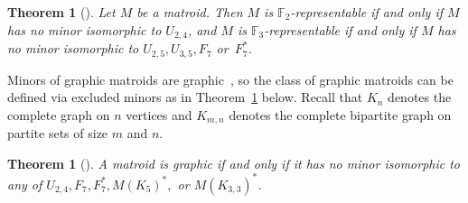 \documentclass[12pt]{article}
\newtheorem{theorem}[thm]{Theorem}
\theoremstyle{definition}
\newtheorem{remark}[thm]{Remark}
\begin{document}
\begin{theorem}[{\cite[Theorems 6.5.4 and 6.5.7]{oxley}}]\label{theorem: forbidden minors finite field representability}
    Let $M$ be a matroid.
    Then $M$ is $\mathbb{F}_2$-representable if and only if $M$ has no minor isomorphic to $U_{2,4}$,
    and $M$ is $\mathbb{F}_3$-representable if and only if $M$ has no minor isomorphic to $U_{2,5},U_{3,5},F_7$ or~$F_7^*$.
\end{theorem}

Minors of graphic matroids are graphic~\cite[Corollary 3.2.2]{oxley},
so the class of graphic matroids can be defined via excluded minors as in Theorem~\ref{theorem: forbidden minors graphic} below.
Recall that $K_n$ denotes the complete graph on $n$ vertices and $K_{m,n}$ denotes the complete bipartite
graph on partite sets of size $m$ and $n$.

\begin{theorem}[{\cite[Theorem~10.3.1]{oxley}}]\label{theorem: forbidden minors graphic}
    A matroid is graphic if and only if it has no minor isomorphic to any of
    $U_{2,4},F_7,F_7^*,M(K_5)^*,$ or $M(K_{3,3})^*$.
\end{theorem}



\end{document}
